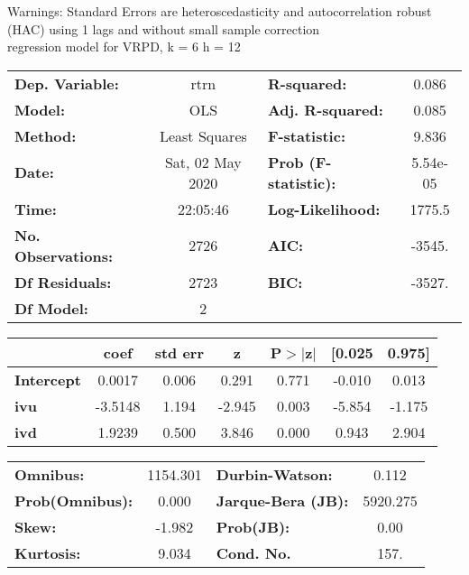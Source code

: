 Warnings: \newline
 [1] Standard Errors are heteroscedasticity and autocorrelation robust (HAC) using 1 lags and without small sample correction\\ 

regression model for VRPD, k = 6 h = 12\begin{center}
\begin{tabular}{lclc}
\toprule
\textbf{Dep. Variable:}    &       rtrn       & \textbf{  R-squared:         } &     0.086   \\
\textbf{Model:}            &       OLS        & \textbf{  Adj. R-squared:    } &     0.085   \\
\textbf{Method:}           &  Least Squares   & \textbf{  F-statistic:       } &     9.836   \\
\textbf{Date:}             & Sat, 02 May 2020 & \textbf{  Prob (F-statistic):} &  5.54e-05   \\
\textbf{Time:}             &     22:05:46     & \textbf{  Log-Likelihood:    } &    1775.5   \\
\textbf{No. Observations:} &        2726      & \textbf{  AIC:               } &    -3545.   \\
\textbf{Df Residuals:}     &        2723      & \textbf{  BIC:               } &    -3527.   \\
\textbf{Df Model:}         &           2      & \textbf{                     } &             \\
\bottomrule
\end{tabular}
\begin{tabular}{lcccccc}
                   & \textbf{coef} & \textbf{std err} & \textbf{z} & \textbf{P$> |$z$|$} & \textbf{[0.025} & \textbf{0.975]}  \\
\midrule
\textbf{Intercept} &       0.0017  &        0.006     &     0.291  &         0.771        &       -0.010    &        0.013     \\
\textbf{ivu}       &      -3.5148  &        1.194     &    -2.945  &         0.003        &       -5.854    &       -1.175     \\
\textbf{ivd}       &       1.9239  &        0.500     &     3.846  &         0.000        &        0.943    &        2.904     \\
\bottomrule
\end{tabular}
\begin{tabular}{lclc}
\textbf{Omnibus:}       & 1154.301 & \textbf{  Durbin-Watson:     } &    0.112  \\
\textbf{Prob(Omnibus):} &   0.000  & \textbf{  Jarque-Bera (JB):  } & 5920.275  \\
\textbf{Skew:}          &  -1.982  & \textbf{  Prob(JB):          } &     0.00  \\
\textbf{Kurtosis:}      &   9.034  & \textbf{  Cond. No.          } &     157.  \\
\bottomrule
\end{tabular}
\end{center}

